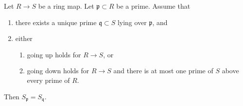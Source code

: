 \begin{lemma}
\label{lemma-unique-prime-over-localize-below}
Let $R \to S$ be a ring map.
Let $\mathfrak p \subset R$ be a prime.
Assume that
\begin{enumerate}
\item there exists a unique prime $\mathfrak q \subset S$ lying over
$\mathfrak p$, and
\item either
\begin{enumerate}
\item going up holds for $R \to S$, or
\item going down holds for $R \to S$ and there is at most one prime
of $S$ above every prime of $R$.
\end{enumerate}
\end{enumerate}
Then $S_{\mathfrak p} = S_{\mathfrak q}$.
\end{lemma}

